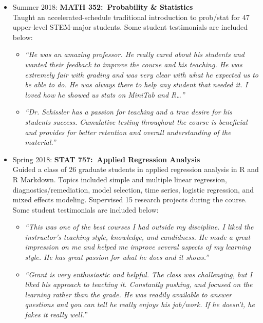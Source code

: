 \documentclass[paper=a4,fontsize=11pt]{scrartcl} %
\newcommand{\CourseEntry}[3]{
		\noindent \item{#1: \textbf{#2} \\ #3}}
\begin{document}
\begin{itemize}[noitemsep]
\CourseEntry{Summer 2018}{MATH 352:~Probability \& Statistics}{Taught an accelerated-schedule traditional introduction to prob/stat for 47 upper-level STEM-major students. Some student testimonials are included below:
\begin{itemize}
\item \emph{\small{``He was an amazing professor. He really cared about his students and wanted their feedback to improve the course and his teaching. He was extremely fair with grading and was very clear with what he expected us to be able to do. He was always there to help any student that needed it. I loved how he showed us stats on MiniTab and R\ldots''}}
\item \emph{\small{``Dr. Schissler has a passion for teaching and a true desire for his students success. Cumulative testing throughout the course is beneficial and provides for better retention and overall understanding of the material.''}}
\end{itemize}
}{} 

\CourseEntry{Spring 2018}{STAT 757:~Applied Regression Analysis}{Guided a class of 26 graduate students in applied regression analysis in R and R Markdown. Topics included simple and multiple linear regression, diagnostics/remediation, model selection, time series, logistic regression, and mixed effects modeling. Supervised 15 research projects during the course. Some student testimonials are included below:
\begin{itemize}
\item \emph{\small{``This was one of the best courses I had outside my discipline. I liked the instructor's teaching style, knowledge, and candidness. He made a great impression on me and helped me improve several aspects of my learning style. He has great passion for what he does and it shows.''}}
\item \emph{\small{``Grant is very enthusiastic and helpful. The class was challenging, but I liked his approach to teaching it. Constantly pushing, and focused on the learning rather than the grade. He was readily available to answer questions and you can tell he really enjoys his job/work. If he doesn't, he fakes it really well.''}}
\end{itemize}
}{} 


\end{itemize}
\end{document}
